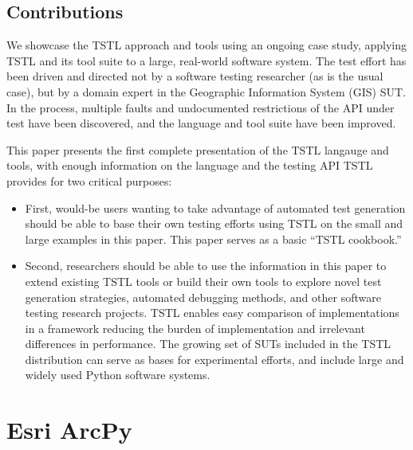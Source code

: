 \subsection{Contributions}

We showcase the TSTL approach and tools using an ongoing case study,
applying TSTL and its tool suite to a large, real-world software
system.  The test effort has been driven and directed not by a
software testing researcher (as is the usual case), but by a domain
expert in the Geographic Information System (GIS) SUT.  In the
process, multiple faults and undocumented restrictions of the API
under test have been discovered, and the language and tool suite have
been improved.

This paper presents the first complete presentation of the TSTL
langauge and tools, with enough information on the language and the
testing API TSTL provides for two critical purposes:

\begin{itemize}
\item First, would-be users wanting to take advantage of automated
  test generation should be able to base their own testing
  efforts using TSTL on the small and large examples in this paper.
  This paper serves as a basic ``TSTL cookbook.''

\item Second, researchers should be able to use the information in this paper to
  extend existing TSTL tools or build their own tools to explore novel
  test generation strategies, automated debugging methods, and other
  software testing research projects.  TSTL enables easy comparison of
  implementations in a framework reducing the burden of implementation
  and irrelevant differences in performance.  The growing set of SUTs
  included in the TSTL distribution can serve as bases for
  experimental efforts, and include large and widely used Python
  software systems.
\end{itemize}

\section{Esri ArcPy}


